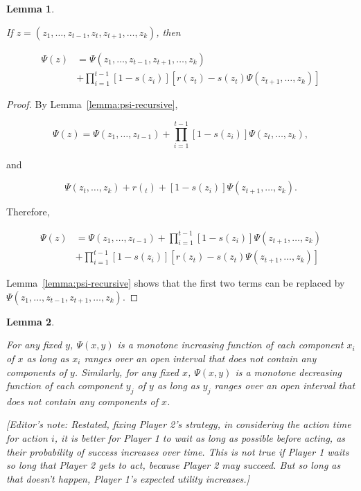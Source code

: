 \documentclass{article}
\newtheorem{lemma}{Lemma}
\begin{document}
\begin{lemma} \label{lemma:psi-remove-one}

If $z = (z_1, \dots, z_{t-1}, z_t, z_{t+1}, \dots, z_k)$, then

\[
\begin{aligned}
\Psi(z) &= \Psi(z_1, \dots, z_{t-1}, z_{t+1}, \dots, z_k)  \\
&+ \prod_{i=1}^{t-1} [1 - s(z_i)] [r(z_t) - s(z_t) \Psi(z_{t+1}, \dots, z_k)]
\end{aligned}
\]

\end{lemma}

\begin{proof}

By Lemma~\ref{lemma:psi-recursive},

\[
\Psi(z) = \Psi(z_1, \dots, z_{t-1}) +
\prod_{i=1}^{t-1} [1-s(z_i)] \Psi(z_t, \dots, z_k),
\]

and

\[
\Psi(z_t, \dots, z_k) +
r(_t) + [1-s(z_i)] \Psi(z_{t+1}, \dots, z_k).
\]

Therefore,

\[
\begin{aligned}
\Psi(z) &= \Psi(z_1, \dots, z_{t-1}) +
\prod_{i=1}^{t-1} [1 - s(z_i)] \Psi(z_{t+1}, \dots, z_k) \\
&+ \prod_{i=1}^{t-1} [1 - s(z_i)] [r(z_t) - s(z_t) \Psi(z_{t+1}, \dots, z_k)]
\end{aligned}
\]

Lemma~\ref{lemma:psi-recursive} shows that the first two terms can be replaced
by \\ $\Psi(z_1, \dots, z_{t-1}, z_{t+1}, \dots, z_k)$.

\end{proof}


\begin{lemma} \label{lemma:psi-monotone-increasing}

For any fixed $y$, $\Psi(x, y)$ is a monotone increasing function of each
component $x_i$ of $x$ as long as $x_i$ ranges over an open interval that does
not contain any components of $y$. Similarly, for any fixed $x$, $\Psi(x, y)$
is a monotone decreasing function of each component $y_j$ of $y$ as long as
$y_j$ ranges over an open interval that does not contain any components of $x$.

[\emph{Editor's note:} Restated, fixing Player 2's strategy, in considering the
action time for action $i$, it is better for Player 1 to wait as long as
possible before acting, as their probability of success increases over time.
This is not true if Player 1 waits so long that Player 2 gets to act, because
Player 2 may succeed. But so long as that doesn't happen, Player 1's expected
utility increases.]

\end{lemma}
\end{document}
